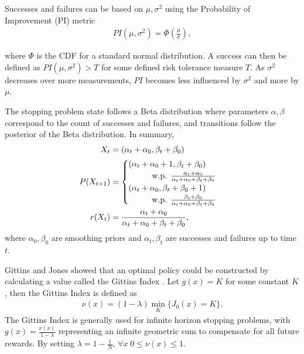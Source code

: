 Successes and failures can be based on $\mu, \sigma^2$ using the Probability of Improvement (PI) metric
\begin{align}
  PI(\mu, \sigma^2) = \Phi(\frac{\mu}{\sigma}),
\end{align}

where $\Phi$ is the CDF for a standard normal distribution. A success can then be defined as $PI(\mu, \sigma^2) > T$ for some defined risk tolerance measure $T$. As $\sigma^2$ decreases over more measurements, $PI$ becomes less influenced by $\sigma^2$ and more by $\mu$. 

The stopping problem state follows a Beta distribution where parameters $\alpha,\beta$ correspond to the count of successes and failures, and transitions follow the posterior of the Beta distribution. In summary,
\begin{align}
\begin{split}
  X_t &= (\alpha_t + \alpha_0, \beta_t + \beta_0) \\
  P(X_{t+1}) &=
  \begin{cases}
      (\alpha_t + \alpha_0 + 1, \beta_t + \beta_0)
      \\ \hspace*{1cm}\text{w.p. } \frac{\alpha_t + \alpha_0}{\alpha_t + \alpha_0 + \beta_t + \beta_0}\\
      (\alpha_t + \alpha_0, \beta_t + \beta_0 + 1)
      \\ \hspace*{1cm}\text{w.p. } \frac{\beta_t + \beta_0}{\alpha_t + \alpha_0 + \beta_t + \beta_0}
  \end{cases}\\
  r(X_t) &= \frac{\alpha_t + \alpha_0}{\alpha_t + \alpha_0 + \beta_t + \beta_0},\\
\end{split}
\end{align}
where $\alpha_0,\beta_0$ are smoothing priors and $\alpha_t,\beta_t$ are successes and failures up to time $t$.

Gittins and Jones showed that an optimal policy could be constructed by calculating a value called the Gittins Index \citep{doi:10.1002/9781118596333.ch24}. Let $g(x) = K$ for some constant $K$, then the Gittins Index is defined as
\begin{align}
  \nu(x) = (1-\lambda)\min_{K} \{J_0(x) = K\}.
\end{align}
The Gittins Index is generally used for infinite horizon stopping problems, with $g(x)=\frac{\nu(x)}{1-\lambda}$ representing an infinite geometric sum to compensate for all future rewards. By setting $\lambda=1-\frac{1}{N}$, $\forall x \; 0 \leq \nu(x) \leq 1$.

